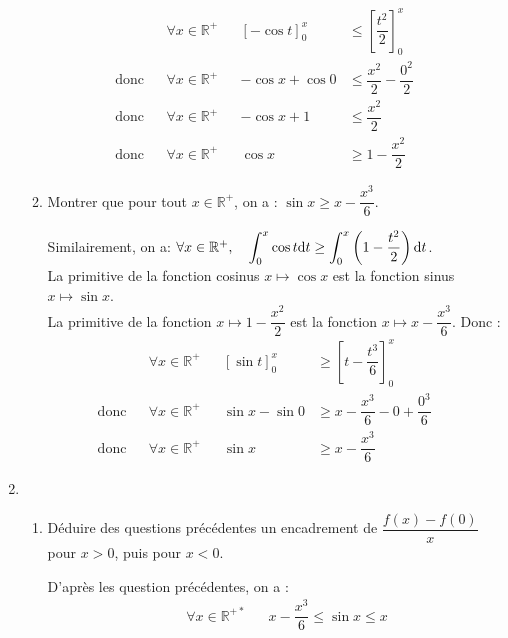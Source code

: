 \documentclass[a4paper,french,bookmarks]{article}
\begin{document}
\begin{enumerate}
\begin{enumerate}
\begin{tcolorbox}[colback=black!3,colframe=black!9,boxrule=.25pt,enhanced,arc is angular,arc=0pt]
  \begin{align*}
      && \forall x \in \mathbb{R}^+ && \left[ -\cos t \right]^x_0 &\leq \left[\dfrac{t^2}{2}\right]^x_0&&\\
      \text{donc} && \forall x \in \mathbb{R}^+ && -\cos x + \cos 0 &\leq \dfrac{x^2}{2} - \dfrac{0^2}{2}\\
      \text{donc} && \forall x \in \mathbb{R}^+ && -\cos x + 1 &\leq \dfrac{x^2}{2}\\
      \text{donc} && \forall x \in \mathbb{R}^+ && \cos x &\geq 1 - \dfrac{x^2}{2}
  \end{align*}
 \end{tcolorbox}
 \item Montrer que pour tout $x \in \mathbb{R}^+$, on a : \quad $\sin x \geq x - \dfrac{x^3}{6}$.
  \begin{tcolorbox}[colback=black!3,colframe=black!9,boxrule=.25pt,enhanced,arc is angular,arc=0pt]
 Similairement, on a:
 \( \forall x \in \mathbb{R}^+, \quad \displaystyle \int_0^x \cos t \text dt \geq \int_0^x \left(1 - \dfrac{t^2}{2}\right) \text dt \).\\
 La primitive de la fonction cosinus $x \mapsto \cos x$ est la fonction sinus $x \mapsto \sin x$.\\
 La primitive de la fonction $x \mapsto 1 - \dfrac{x^2}{2}$ est la fonction $x \mapsto x - \dfrac{x^3}{6}$. Donc :
  \begin{align*}
      && \forall x \in \mathbb{R}^+ && \left[ \sin t \right]^x_0 &\geq \left[t - \dfrac{t^3}{6}\right]^x_0&&\\
      \text{donc} && \forall x \in \mathbb{R}^+ && \sin x - \sin 0 &\geq x-\dfrac{x^3}{6}-0+\dfrac{0^3}{6}\\
      \text{donc} && \forall x \in \mathbb{R}^+ && \sin x &\geq x-\dfrac{x^3}{6}
  \end{align*}
 \end{tcolorbox}
\end{enumerate}
\item 
\begin{enumerate}
    \item Déduire des questions précédentes un encadrement de $\dfrac{f\left(x\right) - f\left(0\right)}{x}$ pour $x > 0$, puis pour $x < 0$.
    \begin{tcolorbox}[colback=black!3,colframe=black!9,boxrule=.25pt,enhanced,arc is angular,arc=0pt]
    D'après les question précédentes, on a :
    \begin{align*}
        && \forall x \in \mathbb{R}^{+*} && x - \dfrac{x^3}{6} \leq \sin x \leq x\\

\end{align*}
\end{tcolorbox}
\end{enumerate}
\end{enumerate}
\end{document}
